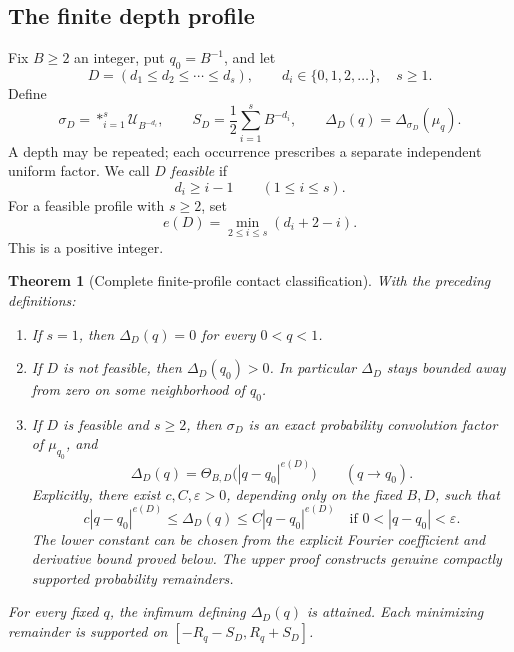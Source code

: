 \documentclass[11pt,letterpaper]{article}
\newtheorem{theorem}{Theorem}[section]
\theoremstyle{definition}
\theoremstyle{remark}
\newcommand{\Un}{\mathcal U}
\begin{document}
\subsection{The finite depth profile}
Fix $B\ge2$ an integer, put $q_0=B^{-1}$, and let
\[
 D=(d_1\le d_2\le\cdots\le d_s),\qquad d_i\in\{0,1,2,\ldots\},\quad s\ge1.
\]
Define
\begin{equation}\label{eq:profile}
 \sigma_D=\mathop{*}_{i=1}^s\Un_{B^{-d_i}},\qquad
 S_D=\frac12\sum_{i=1}^s B^{-d_i},\qquad
 \Delta_D(q)=\Delta_{\sigma_D}(\mu_q).
\end{equation}
A depth may be repeated; each occurrence prescribes a separate independent uniform factor. We call $D$ \emph{feasible} if
\begin{equation}\label{eq:feasible}
 d_i\ge i-1\qquad(1\le i\le s).
\end{equation}
For a feasible profile with $s\ge2$, set
\begin{equation}\label{eq:contact-exponent}
 e(D)=\min_{2\le i\le s}(d_i+2-i).
\end{equation}
This is a positive integer.

\begin{theorem}[Complete finite-profile contact classification]\label{thm:main}
With the preceding definitions:
\begin{enumerate}[label=\textup{(\roman*)}]
\item If $s=1$, then $\Delta_D(q)=0$ for every $0<q<1$.
\item If $D$ is not feasible, then $\Delta_D(q_0)>0$. In particular $\Delta_D$ stays bounded away from zero on some neighborhood of $q_0$.
\item If $D$ is feasible and $s\ge2$, then $\sigma_D$ is an exact probability convolution factor of $\mu_{q_0}$, and
\begin{equation}\label{eq:main-theta}
 \Delta_D(q)=\Theta_{B,D}\bigl(|q-q_0|^{e(D)}\bigr)
 \qquad(q\longrightarrow q_0).
\end{equation}
Explicitly, there exist $c,C,\varepsilon>0$, depending only on the fixed $B,D$, such that
\[
 c|q-q_0|^{e(D)}\le\Delta_D(q)\le C|q-q_0|^{e(D)}
 \quad\text{if }0<|q-q_0|<\varepsilon.
\]
The lower constant can be chosen from the explicit Fourier coefficient and derivative bound proved below. The upper proof constructs genuine compactly supported probability remainders.
\end{enumerate}
For every fixed $q$, the infimum defining $\Delta_D(q)$ is attained. Each minimizing remainder is supported on $[-R_q-S_D,R_q+S_D]$.
\end{theorem}
\end{document}
